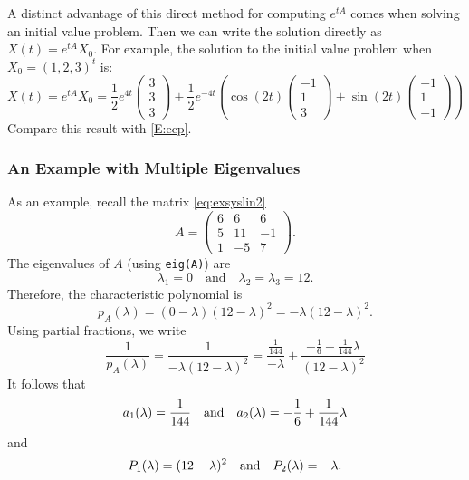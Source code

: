 \documentclass{ximera}
\begin{document}
A distinct advantage of this direct method for computing $e^{tA}$ comes
when solving an initial value problem.  Then we can write the solution 
directly as $X(t)=e^{tA}X_0$.  For example, the solution to the initial
value problem when $X_0=(1,2,3)^t$ is:
\[
X(t) = e^{tA}X_0 = \frac{1}{2}e^{4t}
\left(\begin{array}{c} 3\\3\\3\end{array}\right)
+ \frac{1}{2}e^{-4t}\left(\cos(2t)\left(\begin{array}{r}
-1\\1\\3\end{array}\right)+\sin(2t)
\left(\begin{array}{r} -1\\1\\-1 \end{array}\right)\right) 
\]
Compare this result with \eqref{E:ecp}.


\subsubsection*{An Example with Multiple Eigenvalues}

As an example, recall the matrix \eqref{eq:exsyslin2}
\[
A =
\left(\begin{array}{rrr}
     6  &  6  &  6\\
     5  & 11  & -1\\
     1  & -5  &  7
\end{array}\right).
\]
The eigenvalues of $A$ (using {\tt eig(A)}) are
\[
\lambda_1=0\quad \mbox{and}\quad \lambda_2=\lambda_3=12.
\]
Therefore, the characteristic polynomial is
\[
p_A(\lambda) = (0-\lambda)(12-\lambda)^2=-\lambda(12-\lambda)^2.
\]
Using partial fractions, we write
\[
\frac{1}{p_A(\lambda)} = \frac{1}{-\lambda(12-\lambda)^2}=
\frac{\frac{1}{144}}{-\lambda} + 
\frac{-\frac{1}{6}+\frac{1}{144}\lambda}{(12-\lambda)^2}
\]
It follows that 
\[
a_1(\lambda)=\frac{1}{144} \quad\mbox{and}\quad a_2(\lambda) = -\frac{1}{6}+\frac{1}{144}\lambda
\]
and
\[
P_1(\lambda)=(12-\lambda)^2 \quad\mbox{and}\quad P_2(\lambda) = -\lambda.
\]
\end{document}
